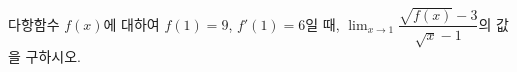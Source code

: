 다항함수 $f(x)$에 대하여 $f(1)=9$, $f'(1)=6$일 때, $\displaystyle\lim_{x\to 1}\dfrac{\sqrt{f(x)}-3}{\sqrt{x}-1}$의 값을 구하시오. 
